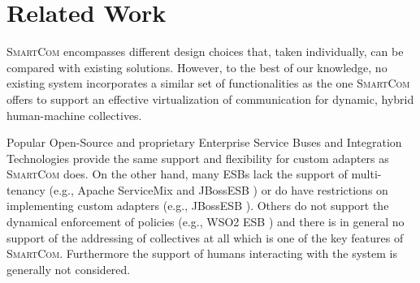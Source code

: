 \documentclass{llncs}
\newcommand{\mdl}{\textsc{SmartCom}}
\begin{document}
\section{Related Work}
\label{sec:relwork}
  
  \mdl{} encompasses different design choices that, taken individually, can be compared with existing solutions. However, to the best of our knowledge, no existing system incorporates a similar set of functionalities as the one \mdl{} offers to support an effective virtualization of communication for dynamic, hybrid human-machine collectives.

  Popular Open-Source and proprietary Enterprise Service Buses and Integration Technologies provide the same support and flexibility for custom adapters as \mdl{} does. On the other hand, many ESBs lack the support of multi-tenancy (e.g., Apache ServiceMix \cite{ApacheServiceMix} and JBossESB \cite{JBoss}) or do have restrictions on implementing custom adapters (e.g., JBossESB \cite{JBoss}). Others do not support the dynamical enforcement of policies (e.g., WSO2 ESB \cite{WSO2}) and there is in general no support of the addressing of collectives at all which is one of the key features of \mdl{}. Furthermore the support of humans interacting with the system is generally not considered.
\end{document}
